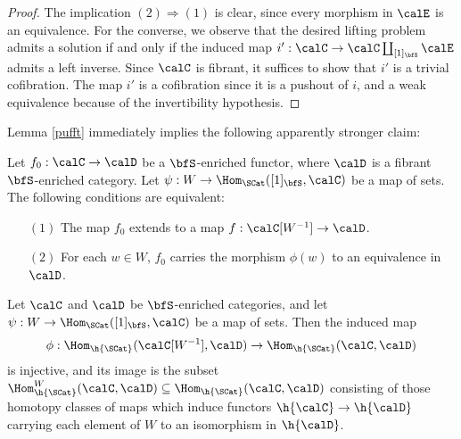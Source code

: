 \begin{proof}
The implication $(2) \Rightarrow (1)$ is clear, since every morphism in
$\calE$ is an equivalence. For the converse, we observe that
the desired lifting problem admits a solution if and only if the induced map
$i': \calC \rightarrow \calC \coprod_{[1]_{\bfS} } \calE$ admits a left inverse.
Since $\calC$ is fibrant, it suffices to show that $i'$ is a trivial cofibration.
The map $i'$ is a cofibration since it is a pushout of $i$, and a weak equivalence
because of the invertibility hypothesis. 
\end{proof}

Lemma \ref{pufft} immediately implies the following apparently stronger claim:

\begin{lemma}\label{canner}
Let $f_0: \calC \rightarrow \calD$ be a $\bfS$-enriched functor, where
$\calD$ is a fibrant $\bfS$-enriched category. Let $\psi: W \rightarrow \Hom_{\SCat}([1]_{\bfS},\calC)$ be a map of sets. The following conditions are equivalent:
\begin{itemize}
\item[$(1)$] The map $f_0$ extends to a map $f: \calC[W^{-1}] \rightarrow \calD$.
\item[$(2)$] For each $w \in W$, $f_0$ carries the morphism $\phi(w)$ to an equivalence in $\calD$.
\end{itemize}
\end{lemma}

\begin{proposition}\label{postcan}
Let $\calC$ and $\calD$ be $\bfS$-enriched categories, and let
$\psi: W \rightarrow \Hom_{\SCat}( [1]_{\bfS}, \calC)$ be a map of sets.
Then the induced map
$$ \phi: \Hom_{\h{\SCat}}( \calC[W^{-1}], \calD) \rightarrow \Hom_{\h{\SCat}}(\calC, \calD)$$
is injective, and its image is the subset $\Hom^{W}_{\h{\SCat}}(\calC, \calD)
\subseteq \Hom_{\h{\SCat}}(\calC, \calD)$ consisting of those homotopy classes of maps
which induce functors $\h{\calC} \rightarrow \h{\calD}$ carrying each element of $W$ to an isomorphism in $\h{\calD}$. 
\end{proposition}


